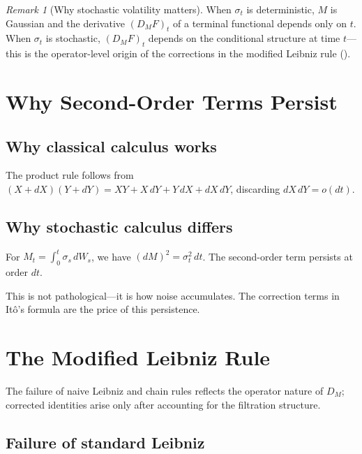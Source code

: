 \documentclass[11pt]{article}
\theoremstyle{plain}
\theoremstyle{definition}
\theoremstyle{remark}
\newtheorem{remark}{Remark}[section]
\begin{document}
\begin{remark}[Why stochastic volatility matters]
When $\sigma_t$ is deterministic, $M$ is Gaussian and the derivative $(D_M F)_t$ 
of a terminal functional depends only on $t$. When $\sigma_t$ is stochastic, 
$(D_M F)_t$ depends on the conditional structure at time $t$---this is the 
operator-level origin of the corrections in the modified Leibniz rule 
().
\end{remark}

\section{Why Second-Order Terms Persist}\label{sec:second-order}

\subsection{Why classical calculus works}

The product rule follows from $(X + dX)(Y + dY) = XY + X\,dY + Y\,dX + dX\,dY$, 
discarding $dX\,dY = o(dt)$.

\subsection{Why stochastic calculus differs}

For $M_t = \int_0^t \sigma_s\,dW_s$, we have $(dM)^2 = \sigma_t^2\,dt$. The 
second-order term persists at order $dt$.

This is not pathological---it is how noise accumulates. The correction terms 
in It\^o's formula are the price of this persistence.

\section{The Modified Leibniz Rule}\label{sec:leibniz}

The failure of naive Leibniz and chain rules reflects the operator nature of 
$D_M$; corrected identities arise only after accounting for the filtration 
structure.

\subsection{Failure of standard Leibniz}
\end{document}
